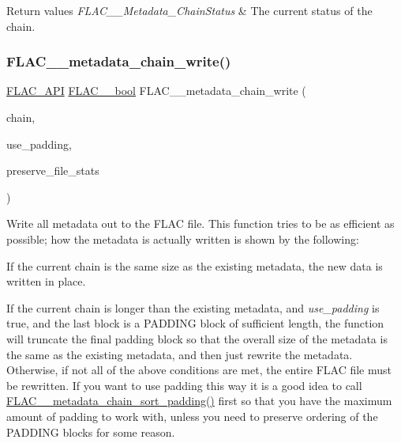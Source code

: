 \begin{DoxyRetVals}{Return values}
{\em F\+L\+A\+C\+\_\+\+\_\+\+Metadata\+\_\+\+Chain\+Status} & The current status of the chain. \\
\hline
\end{DoxyRetVals}
\mbox{\label{group__flac__metadata__level2_gaa15ead7230217de8e79f4af822cda490}} 
\subsubsection{\texorpdfstring{F\+L\+A\+C\+\_\+\+\_\+metadata\+\_\+chain\+\_\+write()}{FLAC\_\_metadata\_chain\_write()}}
{\footnotesize\ttfamily \hyperlink{group__flac__export_ga56ca07df8a23310707732b1c0007d6f5}{F\+L\+A\+C\+\_\+\+A\+PI} \hyperlink{ordinals_8h_a95103469f1cbd78b8cf250194985b34e}{F\+L\+A\+C\+\_\+\+\_\+bool} F\+L\+A\+C\+\_\+\+\_\+metadata\+\_\+chain\+\_\+write (\begin{DoxyParamCaption}\item[{\hyperlink{group__flac__metadata__level2_gaec6993c60b88f222a52af86f8f47bfdf}{F\+L\+A\+C\+\_\+\+\_\+\+Metadata\+\_\+\+Chain} $\ast$}]{chain,  }\item[{\hyperlink{ordinals_8h_a95103469f1cbd78b8cf250194985b34e}{F\+L\+A\+C\+\_\+\+\_\+bool}}]{use\+\_\+padding,  }\item[{\hyperlink{ordinals_8h_a95103469f1cbd78b8cf250194985b34e}{F\+L\+A\+C\+\_\+\+\_\+bool}}]{preserve\+\_\+file\+\_\+stats }\end{DoxyParamCaption})}

Write all metadata out to the F\+L\+AC file. This function tries to be as efficient as possible; how the metadata is actually written is shown by the following\+:

If the current chain is the same size as the existing metadata, the new data is written in place.

If the current chain is longer than the existing metadata, and {\itshape use\+\_\+padding} is {\ttfamily true}, and the last block is a P\+A\+D\+D\+I\+NG block of sufficient length, the function will truncate the final padding block so that the overall size of the metadata is the same as the existing metadata, and then just rewrite the metadata. Otherwise, if not all of the above conditions are met, the entire F\+L\+AC file must be rewritten. If you want to use padding this way it is a good idea to call \hyperlink{group__flac__metadata__level2_gaa14304da1c8e706808cfafa5cbbf575b}{F\+L\+A\+C\+\_\+\+\_\+metadata\+\_\+chain\+\_\+sort\+\_\+padding()} first so that you have the maximum amount of padding to work with, unless you need to preserve ordering of the P\+A\+D\+D\+I\+NG blocks for some reason.

